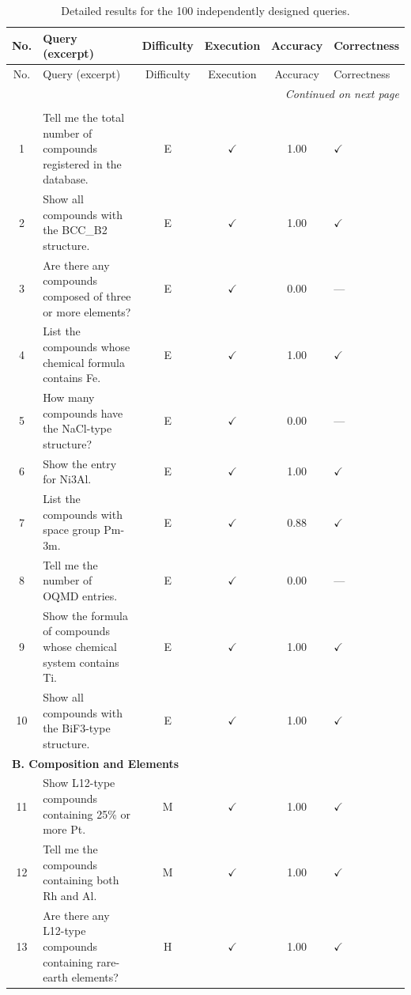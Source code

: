 \documentclass[5p,twocolumn]{elsarticle}
\begin{document}
\begin{longtable}{clcccl}
  \caption{Detailed results for the 100 independently designed queries.}
  \label{tab:sup_expert_detail} \\
  \toprule
  No. & Query (excerpt) & Difficulty & Execution & Accuracy & Correctness \\
  \midrule
  \endfirsthead
  \toprule
  No. & Query (excerpt) & Difficulty & Execution & Accuracy & Correctness \\
  \midrule
  \endhead
  \midrule
  \multicolumn{6}{r}{\textit{Continued on next page}} \\
  \endfoot
  \bottomrule
  \endlastfoot
    \multicolumn{6}{l}{\textbf{A. Basic Search}} \\
    \midrule
    1 & Tell me the total number of compounds registered in the database. & E & $\checkmark$ & 1.00 & $\checkmark$ \\
    2 & Show all compounds with the BCC\_B2 structure. & E & $\checkmark$ & 1.00 & $\checkmark$ \\
    3 & Are there any compounds composed of three or more elements? & E & $\checkmark$ & 0.00 & --- \\
    4 & List the compounds whose chemical formula contains Fe. & E & $\checkmark$ & 1.00 & $\checkmark$ \\
    5 & How many compounds have the NaCl-type structure? & E & $\checkmark$ & 0.00 & --- \\
    6 & Show the entry for Ni3Al. & E & $\checkmark$ & 1.00 & $\checkmark$ \\
    7 & List the compounds with space group Pm-3m. & E & $\checkmark$ & 0.88 & $\checkmark$ \\
    8 & Tell me the number of OQMD entries. & E & $\checkmark$ & 0.00 & --- \\
    9 & Show the formula of compounds whose chemical system contains Ti. & E & $\checkmark$ & 1.00 & $\checkmark$ \\
    10 & Show all compounds with the BiF3-type structure. & E & $\checkmark$ & 1.00 & $\checkmark$ \\
    \midrule
    \multicolumn{6}{l}{\textbf{B. Composition and Elements}} \\
    \midrule
    11 & Show L12-type compounds containing 25\% or more Pt. & M & $\checkmark$ & 1.00 & $\checkmark$ \\
    12 & Tell me the compounds containing both Rh and Al. & M & $\checkmark$ & 1.00 & $\checkmark$ \\
    13 & Are there any L12-type compounds containing rare-earth elements? & H & $\checkmark$ & 1.00 & $\checkmark$ \\

\end{longtable}
\end{document}
